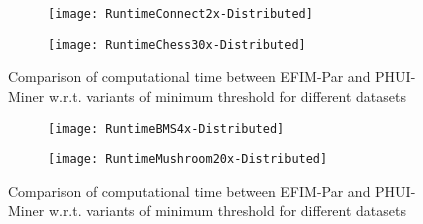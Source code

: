 \documentclass[11pt,openright]{report}
\begin{document}
\begin{figure}
	\begin{subfigure}{\textwidth}
		\centering
		\texttt{[image: RuntimeConnect2x-Distributed]}
		\label{fig:graph-connect2x-distributed} 
		\bigskip
	\end{subfigure}    
	\begin{subfigure}{\textwidth}
		\centering
		\texttt{[image: RuntimeChess30x-Distributed]}
		\label{fig:graph-chess30x-distributed}
	\end{subfigure}
	\caption{Comparison of computational time between EFIM-Par and PHUI-Miner w.r.t. variants of minimum threshold for different datasets}
\end{figure}
\begin{figure} \ContinuedFloat
	\begin{subfigure}{\textwidth}
		\centering
		\texttt{[image: RuntimeBMS4x-Distributed]}
		\label{fig:graph-bms-distributed} 
		\bigskip
	\end{subfigure}
	\begin{subfigure}{\textwidth}
		\centering
		\texttt{[image: RuntimeMushroom20x-Distributed]}
		\label{fig:graph-mushroom20x-distributed} 
	\end{subfigure}
	\caption{Comparison of computational time between EFIM-Par and PHUI-Miner w.r.t. variants of minimum threshold for different datasets}
	\label{fig:graph-comparison-distributed}
\end{figure}
\end{document}
